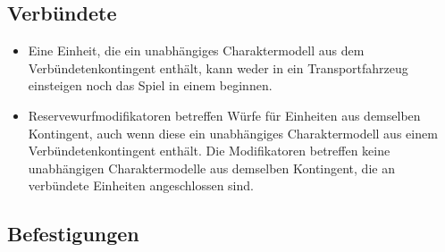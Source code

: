 \subsection{Verbündete}

\begin{itemize}

 \item Eine Einheit, die ein unabhängiges Charaktermodell aus dem
  Verbündetenkontingent enthält, kann weder in ein Transportfahrzeug einsteigen
  noch das Spiel in einem beginnen.

 \item Reservewurfmodifikatoren betreffen Würfe für Einheiten aus demselben
  Kontingent, auch wenn diese ein unabhängiges Charaktermodell aus einem
  Verbündetenkontingent enthält.
Die Modifikatoren betreffen keine unabhängigen Charaktermodelle aus demselben
Kontingent, die an verbündete Einheiten angeschlossen sind.

\end{itemize}

\subsection{Befestigungen}

